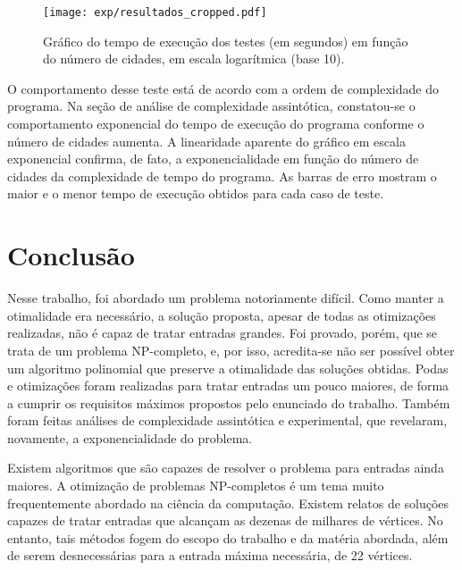 \documentclass[10pt,a4paper]{article}
\numberwithin{equation}{section}
\begin{document}
\begin{figure}[H]
    \centering
    \texttt{[image: exp/resultados\_cropped.pdf]}
    \caption{Gráfico do tempo de execução dos testes (em segundos) em função do número de cidades, em escala logarítmica (base 10).}
    \label{fig:numcidades}
\end{figure}

O comportamento desse teste está de acordo com a ordem de complexidade do programa. Na seção de análise de complexidade assintótica, constatou-se o comportamento exponencial do tempo de execução do programa conforme o número de cidades aumenta. A linearidade aparente do gráfico em escala exponencial confirma, de fato, a exponencialidade em função do número de cidades da complexidade de tempo do programa. As barras de erro mostram o maior e o menor tempo de execução obtidos para cada caso de teste.

\section{Conclusão}

Nesse trabalho, foi abordado um problema notoriamente difícil. Como manter a otimalidade era necessário, a solução proposta, apesar de todas as otimizações realizadas, não é capaz de tratar entradas grandes. Foi provado, porém, que se trata de um problema NP-completo, e, por isso, acredita-se não ser possível obter um algoritmo polinomial que preserve a otimalidade das soluções obtidas. Podas e otimizações foram realizadas para tratar entradas um pouco maiores, de forma a cumprir os requisitos máximos propostos pelo enunciado do trabalho. Também foram feitas análises de complexidade assintótica e experimental, que revelaram, novamente, a exponencialidade do problema.

Existem algoritmos que são capazes de resolver o problema para entradas ainda maiores. A otimização de problemas NP-completos é um tema muito frequentemente abordado na ciência da computação. Existem relatos de soluções capazes de tratar entradas que alcançam as dezenas de milhares de vértices. No entanto, tais métodos fogem do escopo do trabalho e da matéria abordada, além de serem desnecessárias para a entrada máxima necessária, de 22 vértices.
\end{document}
